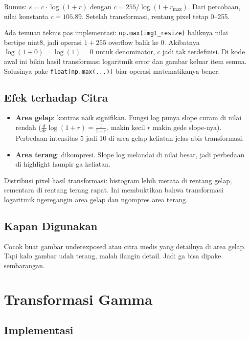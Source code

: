 \documentclass[11pt,a4paper]{article}
\begin{document}
Rumus: $s = c \cdot \log(1 + r)$ dengan $c = 255 / \log(1 + r_{\max})$. Dari percobaan, nilai konstanta $c = 105.89$. Setelah transformasi, rentang pixel tetap 0--255.

Ada temuan teknis pas implementasi: \texttt{np.max(img1\_resize)} baliknya nilai bertipe uint8, jadi operasi $1 + 255$ overflow balik ke 0. Akibatnya $\log(1+0) = \log(1) = 0$ untuk denominator, $c$ jadi tak terdefinisi. Di kode awal ini bikin hasil transformasi logaritmik error dan gambar keluar item semua. Solusinya pake \texttt{float(np.max(...))} biar operasi matematikanya bener.

\subsection{Efek terhadap Citra}

\begin{itemize}
    \item \textbf{Area gelap}: kontras naik signifikan. Fungsi log punya slope curam di nilai rendah ($\frac{d}{dr}\log(1+r) = \frac{1}{1+r}$, makin kecil $r$ makin gede slope-nya). Perbedaan intensitas 5 jadi 10 di area gelap keliatan jelas abis transformasi.
    \item \textbf{Area terang}: dikompresi. Slope log melandai di nilai besar, jadi perbedaan di highlight hampir ga keliatan.
\end{itemize}

Distribusi pixel hasil transformasi: histogram lebih merata di rentang gelap, sementara di rentang terang rapat. Ini membuktikan bahwa transformasi logaritmik ngeregangin area gelap dan ngompres area terang.

\subsection{Kapan Digunakan}

Cocok buat gambar underexposed atau citra medis yang detailnya di area gelap. Tapi kalo gambar udah terang, malah ilangin detail. Jadi ga bisa dipake sembarangan.

\section{Transformasi Gamma}

\subsection{Implementasi}
\end{document}
